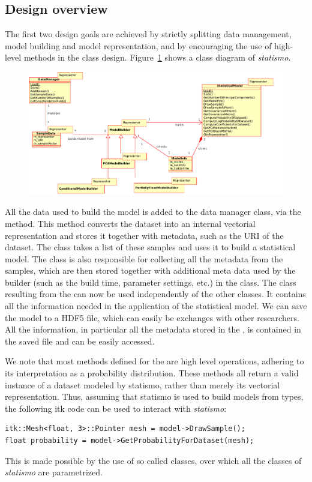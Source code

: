 \documentclass{InsightArticle}
\newcommand{\statismo}{\emph{statismo}\xspace}
\begin{document}
\subsection{Design overview}\label{sec:design-overview}
The first two design goals are achieved by strictly splitting data management, model building and model representation, and by encouraging the use of high-level methods in the class design. 
Figure~\ref{fig:class-diagram} shows a class diagram of \statismo. 
\begin{figure}
  \includegraphics[width=\textwidth]{pictures/class_diagram.pdf}
  \itkcaption{The core classes in \statismo}
  \label{fig:class-diagram}
\end{figure}
All the data used to build the model is added to the data manager
 class, via the  method. This
method converts the dataset into an internal vectorial representation and stores it together
with metadata, such as the URI of the dataset. The 
class takes a list of these samples and uses it to build a statistical
model. The  class is also responsible for
collecting all the metadata from the samples, which are then stored
together with additional meta data used by the builder (such as the
build time, parameter settings, etc.) in the 
class. The  class resulting from the
 can now be used independently of the other
classes. It contains all the information needed in the application of
the statistical model. We can save the model to a HDF5 file, which can easily be exchanges with 
other researchers. All the information, in particular all the
metadata stored in the , is contained in the saved file and can
be easily accessed.


We note that most methods defined for the
 are high level operations, adhering to its
interpretation as a probability distribution. 
These methods all return a valid instance of a dataset modeled by statismo, rather than 
merely its vectorial representation. 
Thus, assuming that statismo is used to build models from  types, 
the following itk code can be used to 
interact with \statismo:
\begin{verbatim}
itk::Mesh<float, 3>::Pointer mesh = model->DrawSample();
float probability = model->GetProbabilityForDataset(mesh);
\end{verbatim}
This is made possible by the use of so called  classes, over which all the 
classes of \statismo are parametrized.
\end{document}
